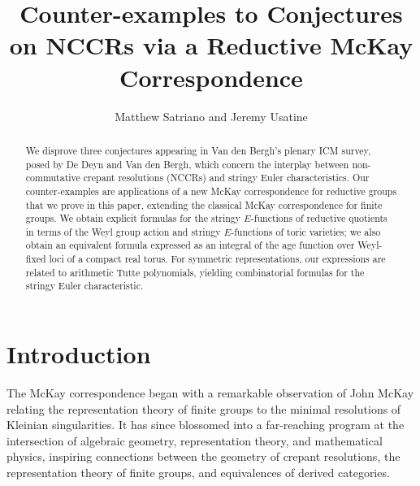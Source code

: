 \documentclass[12pt,a4paper]{amsart}
\title[Counter-examples to NCCR conjectures via Reductive McKay]{Counter-examples to Conjectures on NCCR\lowercase{s} via a Reductive McKay Correspondence}
\author{Matthew Satriano and Jeremy Usatine}
\theoremstyle{definition}
\renewcommand{\1}{\textbf{1}}
\newcommand{\<}{\langle}
\renewcommand{\>}{\rangle}
\begin{document}
\begin{abstract}
\vspace{-0.4em}
We disprove three conjectures appearing in Van den Bergh's plenary ICM survey, posed by De Deyn and Van den Bergh, which concern the interplay between non-commutative crepant resolutions (NCCRs) and stringy Euler characteristics. Our counter-examples are applications of a new McKay correspondence for reductive groups that we prove in this paper, extending the classical McKay correspondence for finite groups. We obtain explicit formulas for the stringy $E$-functions of reductive quotients in terms of the Weyl group action and stringy $E$-functions of toric varieties; we also obtain an equivalent formula expressed as an integral of the age function over Weyl-fixed loci of a compact real torus. For symmetric representations, our expressions are related to arithmetic Tutte polynomials, yielding combinatorial formulas for the stringy Euler characteristic.
\end{abstract}



\maketitle

\setcounter{tocdepth}{1}






\vspace{-1.1em}

\section{Introduction}


The McKay correspondence began with a remarkable observation of John McKay relating the representation theory of finite groups to the minimal resolutions of Kleinian singularities. It has since blossomed into a far-reaching program at the intersection of algebraic geometry, representation theory, and mathematical physics, inspiring connections between the geometry of crepant resolutions, the representation theory of finite groups, and equivalences of derived categories.
\end{document}
